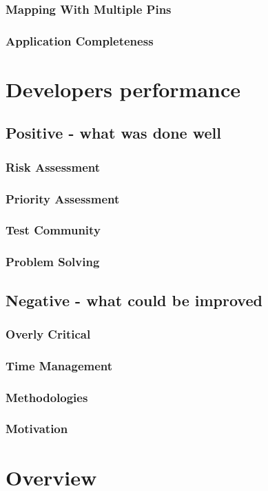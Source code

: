 \subsubsection{Mapping With Multiple Pins}

\subsubsection{Application Completeness}


\section{Developers performance}


\subsection{Positive - what was done well}


\subsubsection{Risk Assessment}

\subsubsection{Priority Assessment}

\subsubsection{Test Community}

\subsubsection{Problem Solving}


\subsection{Negative - what could be improved}

\subsubsection{Overly Critical}

\subsubsection{Time Management}

\subsubsection{Methodologies}

\subsubsection{Motivation}


\section{Overview}

